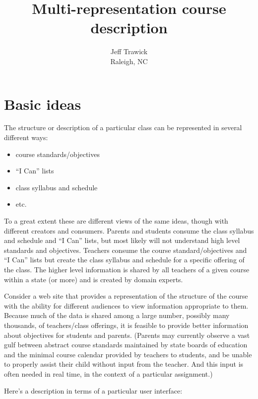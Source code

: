 
\title{Multi-representation course description}
\author{Jeff Trawick\\Raleigh, NC}
\maketitle

\section*{Basic ideas}

The structure or description of a particular class can be represented in several
different ways:

\begin{itemize}
\item course standards/objectives
\item ``I Can'' lists
\item class syllabus and schedule
\item etc.
\end{itemize}

To a great extent these are different views of the same ideas, though
with different creators and consumers.  Parents and students consume the
class syllabus and schedule and ``I Can'' lists, but most likely will
not understand high level standards and objectives.  Teachers consume 
the course standard/objectives and ``I Can'' lists but create the class
syllabus and schedule for a specific offering of the class.  
The higher level information is shared by
all teachers of a given course within a state (or more) and is created by
domain experts.

Consider a web site that provides a representation
of the structure of the course with the ability for different audiences
to view information appropriate to them.  Because much of the data is
shared among a large number, possibly many thousands, of teachers/class offerings, it is feasible
to provide better information about objectives for students and parents.  (Parents may
currently observe a vast gulf between abstract course standards
maintained by state boards of education and the minimal course calendar
provided by teachers to students, and be unable to properly assist their
child without input from the teacher.  And this input is often needed
in real time, in the context of a particular assignment.)

Here's a description in terms of a particular user interface:

